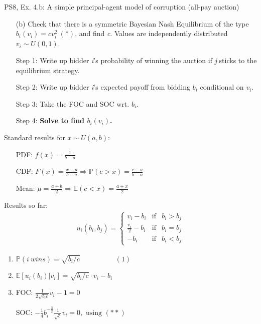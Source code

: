 \begin{frame}{PS8, Ex. 4.b: A simple principal-agent model of corruption (all-pay auction)}
    \begin{itemize}
      \item[(b)] Check that there is a symmetric Bayesian Nash Equilibrium of the type $b_i(v_i) = cv_i^2\ (*)$, and find \textit{c}. Values are independently distributed $v_i\sim U(0, 1)$.
    \end{itemize} \vspace{-8pt}
    \begin{multicols}{2}
      \begin{itemize}
        \item[Step 1:] Write up bidder \textit{i}'s probability of winning the auction if \textit{j} sticks to the equilibrium strategy.
        \item[Step 2:] Write up bidder \textit{i}'s expected payoff from bidding $b_i$ conditional on $v_i$.
        \item[Step 3:] Take the FOC and SOC wrt. $b_i$.
        \item[Step 4:] \textbf{Solve to find $b_i(v_i)$.}
      \end{itemize} \vspace{-8pt}
      \vfill\null\columnbreak
      Standard results for $x\sim U(a, b):$ \vspace{-6pt}
      \begin{itemize}
        \item[PDF:] $f(x)=\frac{1}{b-a}$
        \item[CDF:] $F(x)=\frac{x-a}{b-a}\Rightarrow\mathbb{P}(c>x)=\frac{c-a}{b-a}$
        \item[Mean:] $\mu=\frac{a+b}{2}\Rightarrow\mathbb{E}(c<x)=\frac{a+x}{2}$
      \end{itemize}
      \vspace{-6pt}
      Results so far: \vspace{-6pt}
      \begin{align*}
        u_i(b_i,b_j)=\left\{\begin{array}{lcl}
          v_i-b_i           & \text{if} & b_i>b_j \\
          \frac{v_i}{2}-b_i & \text{if} & b_i=b_j \\
          -b_i              & \text{if} & b_i<b_j
        \end{array}\right.
      \end{align*} \vspace{-16pt}
      \begin{enumerate}
        \item $\mathbb{P}(i\ wins)=\sqrt{b_i/c}\quad\quad\quad\quad\quad(1)$
        \item $\mathbb{E}[u_i(b_i)|v_i]=\sqrt{b_i/c}\cdot v_i-b_i$
        \item FOC: $\frac{1}{2\sqrt{b_ic}}v_i-1=0$
        \item[] SOC: $-\frac{1}{4}b_i^{-\frac{3}{2}}\frac{1}{\sqrt{c}}v_i=0,\text{ using }(**)$
      \end{enumerate}
      \vfill\null
    \end{multicols}
\end{frame}
